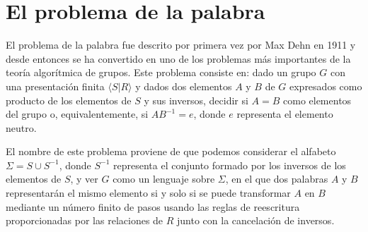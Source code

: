 \documentclass[TFG.tex]{subfiles}
\begin{document}
\section{El problema de la palabra}

El problema de la palabra fue descrito por primera vez por Max Dehn \cite{Dehn11} en 1911 y desde entonces se ha convertido en uno de los problemas más importantes de la teoría algorítmica de grupos. Este problema consiste en: dado un grupo $G$ con una presentación finita $\langle S| R\rangle$ y dados dos elementos $A$ y $B$ de $G$ expresados como producto de los elementos de $S$ y sus inversos, decidir si $A=B$ como elementos del grupo o, equivalentemente, si $AB^{-1}=e$, donde $e$ representa el elemento neutro.

El nombre de este problema proviene de que podemos considerar el alfabeto $\Sigma=S\cup S^{-1}$, donde $S^{-1}$ representa el conjunto formado por los inversos de los elementos de $S$, y ver $G$ como un lenguaje sobre $\Sigma$, en el que dos palabras $A$ y $B$ representarán el mismo elemento si y solo si se puede transformar $A$ en $B$ mediante un número finito de pasos usando las reglas de reescritura proporcionadas por las relaciones de $R$ junto con la cancelación de inversos. 
\end{document}

